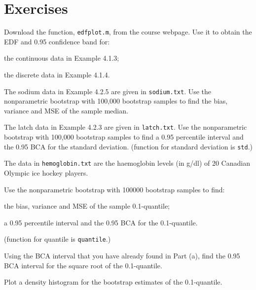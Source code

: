 \section{Exercises}
\work
\begin{exercise}
Download the \Matlab function, {\tt edfplot.m}, from the course webpage. Use it to obtain the EDF and 0.95 confidence band for:
\begin{asparaenum}[(a)]
\item the continuous data in Example 4.1.3;

\item the discrete data in Example 4.1.4.
\end{asparaenum}
\end{exercise}

\begin{exercise}
The sodium data in Example 4.2.5 are given in {\tt sodium.txt}. Use the nonparametric bootstrap with 100,000 bootstrap samples to find the bias, variance and MSE of the sample median.
\end{exercise}

\begin{exercise}
The latch data in Example 4.2.3 are given in {\tt latch.txt}. Use the nonparametric bootstrap with 100,000 bootstrap samples to find a 0.95 percentile interval and the 0.95 BCA for the standard deviation. (\Matlab function for standard deviation is {\tt std}.)
\end{exercise}

\begin{exercise}
The data in {\tt hemoglobin.txt} are the haemoglobin levels (in g/dl) of 20 Canadian Olympic ice hockey players.
\begin{asparaenum}[(A)]
\item	Use the nonparametric bootstrap with 100000 bootstrap samples to find:
\begin{asparaenum}[(i)]
\item the bias, variance and MSE of the sample 0.1-quantile;

\item	a 0.95 percentile interval and the 0.95 BCA for the 0.1-quantile.
\end{asparaenum}
(\Matlab function for quantile is {\tt quantile}.)

\item	Using the BCA interval that you have already found in Part (a), find the 0.95 BCA interval for the square root of the 0.1-quantile.

\item	Plot a density histogram for the bootstrap estimates of the 0.1-quantile.
\end{asparaenum}
\end{exercise}

